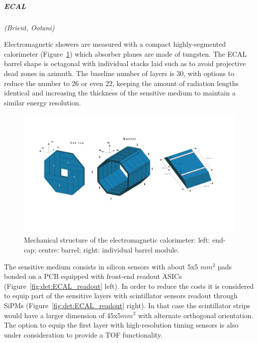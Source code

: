 \vspace{1cm}
\subparagraph*{\bf ECAL}
\textit{(Brient, Ootani)}

Electromagnetic showers are measured with a compact highly-segmented calorimeter (Figure~\ref{fig:det:ECAL}) which absorber planes are made of tungsten. The ECAL barrel shape is octagonal with individual stacks laid such as to avoid projective dead zones in azimuth. The baseline number of layers is 30, with options to reduce the number to 26 or even 22, keeping the amount of radiation lengths identical and increasing the thickness of the sensitive medium to maintain a similar energy resolution. 

\begin{figure}[t!]
\centering
\includegraphics[width=1.2\hsize]{Detector/fig/ECAL_structure.jpg}
\caption{Mechanical structure of the electromagnetic calorimeter: left: end-cap; centre: barrel; right: individual barrel module.}
\label{fig:det:ECAL}
\end{figure}

The sensitive medium consists in silicon sensors with about 5x5 $mm^2$ pads bonded on a PCB equipped with front-end readout ASICs (Figure~\ref{fig:det:ECAL_readout} left). In order to reduce the costs it is considered to equip part of the sensitive layers with scintillator sensors readout through SiPMs (Figure~\ref{fig:det:ECAL_readout} right). In that case the scintillator strips would have a larger dimension of 45x5$mm^2$ with alternate orthogonal orientation. The option to equip the first layer with high-resolution timing sensors is also under consideration to provide a TOF functionality.

